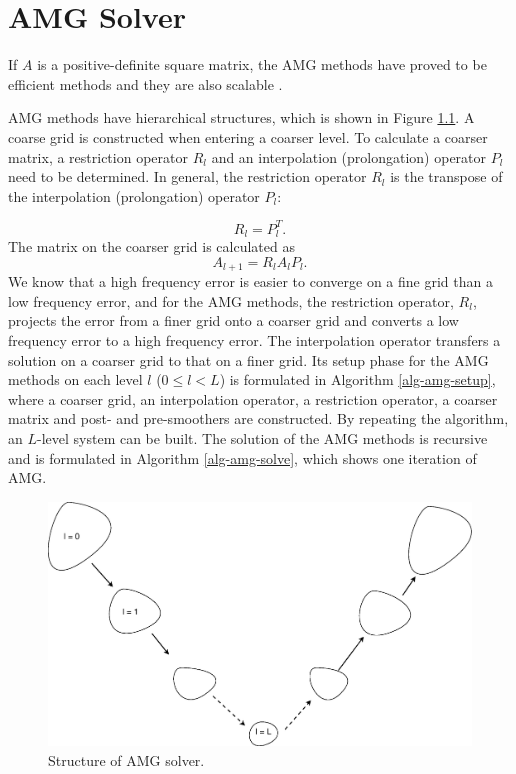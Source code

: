 \chapter{AMG Solver}

If $A$ is a positive-definite square matrix, the AMG methods
\cite{AMG, AMG-OR, Stuben2, BMR, falgout, psm} have proved to be
efficient methods and they are also scalable \cite{rsamg}.

AMG methods have hierarchical structures, which is shown in Figure \ref{fig-amg}.
A coarse grid is constructed when entering a coarser level.
To calculate a coarser matrix, a restriction operator $R_l$ and
an interpolation (prolongation) operator $P_l$ need to be determined.
In general, the restriction operator $R_l$ is the transpose of the interpolation (prolongation) operator $P_l$:

\[
R_l = P_l^T.
\]
The matrix on the coarser grid is calculated as
\begin{equation}
A_{l + 1} = R_l A_l P_l.
\end{equation}
We know that a high frequency error is easier to converge on a fine grid than a low frequency error, and
for the AMG methods,
the restriction operator, $R_l$, projects the error from a finer grid onto a coarser grid and
converts a low frequency error to a high frequency error.
The interpolation operator transfers a solution on a coarser
grid to that on a finer grid.
Its setup phase for the AMG methods on each level $l$ ($0 \leq l < L$) is formulated in
Algorithm \ref{alg-amg-setup}, where a coarser grid, an interpolation operator, a restriction
operator, a coarser matrix and post- and pre-smoothers are constructed.
By repeating the algorithm, an $L$-level system can be built.
The solution of the AMG methods is recursive and is formulated in Algorithm \ref{alg-amg-solve}, which
shows one iteration of AMG.

\begin{figure}[!htb]
    \centering
    \includegraphics[width=0.650\linewidth]{amg}
    \caption{Structure of AMG solver.}
    \label{fig-amg}
\end{figure}

